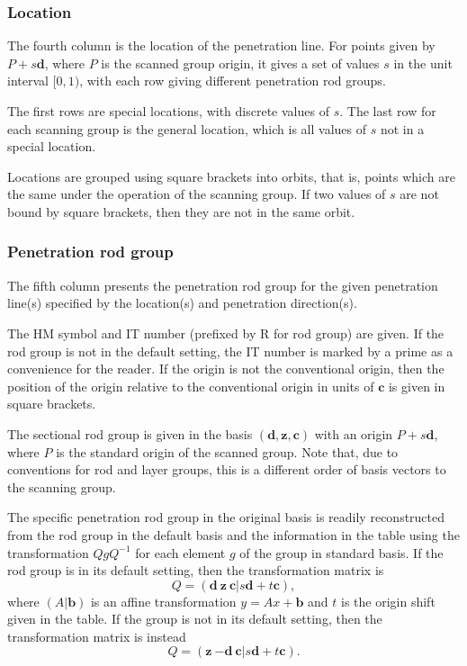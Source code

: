 \subsubsection{Location}

The fourth column is the location of the penetration line.
For points given by $P+s\mathbf{d}$, where $P$ is the scanned group origin, it gives a set of values $s$ in the unit interval $[0,1)$, with each row giving different penetration rod groups.

The first rows are special locations, with discrete values of $s$.
The last row for each scanning group is the general location, which is all values of $s$ not in a special location.

Locations are grouped using square brackets into orbits, that is, points which are the same under the operation of the scanning group.
If two values of $s$ are not bound by square brackets, then they are not in the same orbit.

\subsubsection{Penetration rod group}

The fifth column presents the penetration rod group for the given penetration line(s) specified by the location(s) and penetration direction(s).

The HM symbol and IT number (prefixed by R for rod group) are given.
If the rod group is not in the default setting, the IT number is marked by a prime as a convenience for the reader.
If the origin is not the conventional origin, then the position of the origin relative to the conventional origin in units of $\mathbf{c}$ is given in square brackets.

The sectional rod group is given in the basis $(\mathbf{d},\mathbf{z},\mathbf{c})$ with an origin $P+s\mathbf{d}$, where $P$ is the standard origin of the scanned group.
Note that, due to conventions for rod and layer groups, this is a different order of basis vectors to the scanning group.

The specific penetration rod group in the original basis is readily reconstructed from the rod group in the default basis and the information in the table using the transformation $Q g Q^{-1}$ for each element $g$ of the group in standard basis.
If the rod group is in its default setting, then the transformation matrix is
\begin{equation}
	Q = \left(\mathbf{d}\ \mathbf{z}\ \mathbf{c} | s\mathbf{d} + t\mathbf{c}\right),
\end{equation}
where $(A|\mathbf{b})$ is an affine transformation $y = Ax + \mathbf{b}$ and $t$ is the origin shift given in the table.
If the group is not in its default setting, then the transformation matrix is instead
\begin{equation}
	Q = \left(\mathbf{z}\ {-\mathbf{d}}\ \mathbf{c} | s\mathbf{d} + t\mathbf{c}\right).
\end{equation}


